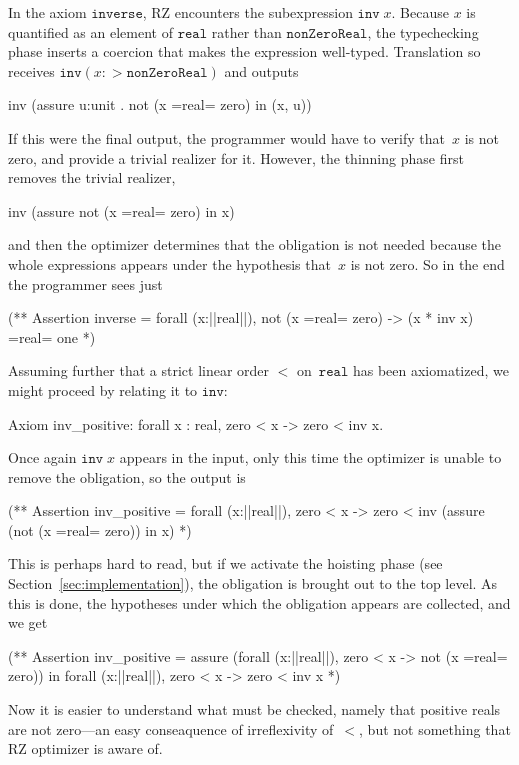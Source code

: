 In the axiom $\mathtt{inverse}$, RZ encounters the subexpression
$\mathtt{inv}\;x$. Because $x$ is quantified as an element of
$\mathtt{real}$ rather than $\mathtt{nonZeroReal}$, the typechecking
phase inserts a coercion that makes the expression well-typed.
Translation so receives $\mathtt{inv}(x \mathbin{{:}{>}}
\mathtt{nonZeroReal})$ and outputs
%
\begin{source}
inv (assure u:unit . not (x =real= zero) in (x, u))
\end{source}
%
If this were the final output, the programmer would have to verify
that~$x$ is not zero, and provide a trivial realizer for it. However,
the thinning phase first removes the trivial realizer,
%
\begin{source}
inv (assure not (x =real= zero) in x)
\end{source}
%
and then the optimizer determines that the obligation is not needed
because the whole expressions appears under the hypothesis that~$x$ is
not zero. So in the end the programmer sees just
%
\begin{source}
(**  Assertion inverse =
  forall (x:||real||),  not (x =real= zero) -> (x * inv x) =real= one
*)
\end{source}
%
Assuming further that a strict linear order $<$ on~$\mathtt{real}$ has
been axiomatized, we might proceed by relating it to $\mathtt{inv}$:
%
\begin{source}
Axiom inv_positive: forall x : real, zero < x -> zero < inv x.
\end{source}
%
Once again $\mathtt{inv}\;x$ appears in the input, only this time the
optimizer is unable to remove the obligation, so the output is
%
\begin{source}
(**  Assertion inv_positive =
       forall (x:||real||),  zero < x ->
         zero < inv (assure (not (x =real= zero)) in x)
*)
\end{source}
%
This is perhaps hard to read, but if we activate the hoisting phase
(see Section~\ref{sec:implementation}), the obligation is brought out
to the top level. As this is done, the hypotheses under which the
obligation appears are collected, and we get
%
\begin{source}
(**  Assertion inv_positive =
  assure (forall (x:||real||),  zero < x -> not (x =real= zero))
    in forall (x:||real||),  zero < x -> zero < inv x
*)
\end{source}
%
Now it is easier to understand what must be checked, namely that
positive reals are not zero---an easy conseaquence of irreflexivity
of~$<$, but not something that RZ optimizer is aware of.


